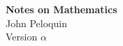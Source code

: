 %
%
%
\begin{center}
\textbf{\Huge Notes on Mathematics}\\
\bigskip
\bigskip
\bigskip
{\Large John Peloquin}\\
\bigskip
\bigskip
\bigskip
Version \(\alpha\)
\end{center}
\newpage